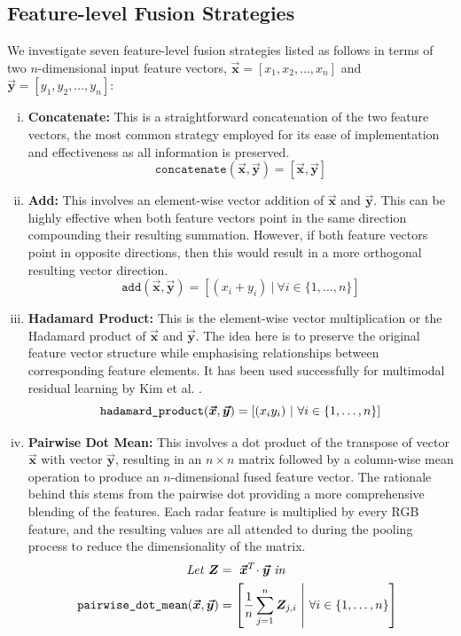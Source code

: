 \documentclass{mpaper}
\newcommand{\verbtt}[1]{
  \text{\normalfont\ttfamily\detokenize{#1}}
}
\begin{document}
\subsection{Feature-level Fusion Strategies}
We investigate seven feature-level fusion strategies listed as follows in terms of two $n$-dimensional input feature vectors, $\bm{\vec{x}} = [x_1, x_2, \ldots, x_n]$ and $\bm{\vec{y}} = [y_1, y_2, \ldots, y_n]$:
\vspace{-0.1cm}
\begin{enumerate}[i.]
    \itemsep-0.1cm
    \item \textbf{Concatenate:} This is a straightforward concatenation of the two feature vectors, the most common strategy employed for its ease of implementation and effectiveness as all information is preserved.
    $$\mathtt{concatenate}(\bm{\vec{x}}, \bm{\vec{y}}) = \left[\bm{\vec{x}}, \bm{\vec{y}}\right]$$

    \item \textbf{Add:} This involves an element-wise vector addition of $\bm{\vec{x}}$ and $\bm{\vec{y}}$. This can be highly effective when both feature vectors point in the same direction compounding their resulting summation. However, if both feature vectors point in opposite directions, then this would result in a more orthogonal resulting vector direction.
    $$\mathtt{add}(\bm{\vec{x}}, \bm{\vec{y}}) = \left[(x_i + y_i) \ | \ \forall i \in \{1, \ldots, n\}\right]$$
    
    \item \textbf{Hadamard Product:} This is the element-wise vector multiplication or the Hadamard product of $\bm{\vec{x}}$ and $\bm{\vec{y}}$. The idea here is to preserve the original feature vector structure while emphasising relationships between corresponding feature elements. It has been used successfully for multimodal residual learning by Kim et al. \cite{kim2016multimodal}.
    $$\verb|hadamard_product|(\bm{\vec{x}}, \bm{\vec{y}}) = \left[(x_iy_i) \ | \ \forall i \in \{1, \ldots, n\}\right]$$
    
    \item \textbf{Pairwise Dot Mean:} This involves a dot product of the transpose of vector $\bm{\vec{x}}$ with vector $\bm{\vec{y}}$, resulting in an $n \times n$ matrix followed by a column-wise mean operation to produce an $n$-dimensional fused feature vector. The rationale behind this stems from the pairwise dot providing a more comprehensive blending of the features. Each radar feature is multiplied by every RGB feature, and the resulting values are all attended to during the pooling process to reduce the dimensionality of the matrix.
    \begin{align*}
        \mathit{Let} \ \bm{Z} & = \ \bm{\vec{x}}^T\!\cdot \bm{\vec{y}} \ \mathit{in} \\
        \hspace{-0.2cm}\verbtt{pairwise_dot_mean}(\bm{\vec{x}}, \bm{\vec{y}}) &= \left[ \frac{1}{n} \sum_{j=1}^n \bm{Z}_{j,i} \ \middle| \ \forall i \in \{1, \ldots, n\}\right]
    \end{align*}
    

\end{enumerate}
\end{document}
